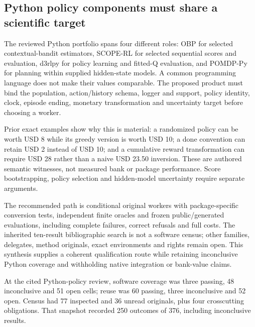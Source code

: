 \hypertarget{python-policy-components-must-share-a-scientific-target}{%
\subsection{Python policy components must share a scientific
target}\label{python-policy-components-must-share-a-scientific-target}}

The reviewed Python portfolio spans four different roles: OBP for
selected contextual-bandit estimators, SCOPE-RL for selected sequential
scores and evaluation, d3rlpy for policy learning and fitted-Q
evaluation, and POMDP-Py for planning within supplied hidden-state
models. A common programming language does not make their values
comparable. The proposed product must bind the population,
action/history schema, logger and support, policy identity, clock,
episode ending, monetary transformation and uncertainty target before
choosing a worker.
\citep{exec23_obp_sources,exec23_scope_rl_sources,exec15_d3rlpy_package,exec23_pomdppy_sources}

Prior exact examples show why this is material: a randomized policy can
be worth USD 8 while its greedy version is worth USD 10; a done
convention can retain USD 2 instead of USD 10; and a cumulative reward
transformation can require USD 28 rather than a naive USD 23.50
inversion. These are authored semantic witnesses, not measured bank or
package performance. Score bootstrapping, policy selection and
hidden-model uncertainty require separate arguments.
\citep{exec15_d3rlpy_exact,exec23_scope_rl_reference,exec15_d3rlpy_value}

The recommended path is conditional original workers with
package-specific conversion tests, independent finite oracles and frozen
public/generated evaluations, including complete failures, correct
refusals and full costs. The inherited ten-result bibliographic search
is not a software census; other families, delegates, method originals,
exact environments and rights remain open. This synthesis supplies a
coherent qualification route while retaining inconclusive Python
coverage and withholding native integration or bank-value claims.
\citep{exec15_d3rlpy_contract,exec23_obp_sources,exec23_scope_rl_sources,exec23_pomdppy_sources,exec24_policiespython_comparison}

At the cited Python-policy review, software coverage was three passing,
48 inconclusive and 51 open cells; reuse was 60 passing, three
inconclusive and 52 open. Census had 77 inspected and 36 unread
originals, plus four crosscutting obligations. That snapshot recorded
250 outcomes of 376, including inconclusive results.
\citep{sp24policiespython_reader,sp24policiespython_progress}

